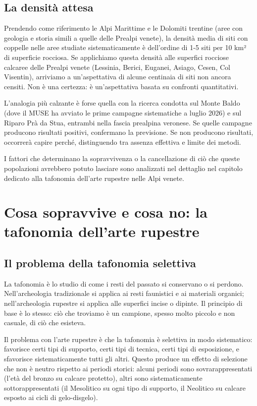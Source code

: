 \subsection{La densità attesa}

Prendendo come riferimento le Alpi Marittime e le Dolomiti trentine (aree con geologia e storia simili a quelle delle Prealpi venete), la densità media di siti con coppelle nelle aree studiate sistematicamente è dell'ordine di 1-5 siti per 10 km² di superficie rocciosa. Se applichiamo questa densità alle superfici rocciose calcaree delle Prealpi venete (Lessinia, Berici, Euganei, Asiago, Cesen, Col Visentin), arriviamo a un'aspettativa di alcune centinaia di siti non ancora censiti. Non è una certezza: è un'aspettativa basata su confronti quantitativi.

L'analogia più calzante è forse quella con la ricerca condotta sul Monte Baldo (dove il MUSE ha avviato le prime campagne sistematiche a luglio 2026) e sul Riparo Prà da Stua, entrambi nella fascia prealpina veronese. Se quelle campagne producono risultati positivi, confermano la previsione. Se non producono risultati, occorrerà capire perché, distinguendo tra assenza effettiva e limite dei metodi.

I fattori che determinano la sopravvivenza o la cancellazione di ciò che queste popolazioni avrebbero potuto lasciare sono analizzati nel dettaglio nel capitolo dedicato alla tafonomia dell'arte rupestre nelle Alpi venete.


\iffalse
\section{Cosa sopravvive e cosa no: la tafonomia dell'arte rupestre}

\subsection{Il problema della tafonomia selettiva}

La tafonomia è lo studio di come i resti del passato si conservano o si perdono. Nell'archeologia tradizionale si applica ai resti faunistici e ai materiali organici; nell'archeologia rupestre si applica alle superfici incise o dipinte. Il principio di base è lo stesso: ciò che troviamo è un campione, spesso molto piccolo e non casuale, di ciò che esisteva.

Il problema con l'arte rupestre è che la tafonomia è selettiva in modo sistematico: favorisce certi tipi di supporto, certi tipi di tecnica, certi tipi di esposizione, e sfavorisce sistematicamente tutti gli altri. Questo produce un effetto di selezione che non è neutro rispetto ai periodi storici: alcuni periodi sono sovrarappresentati (l'età del bronzo su calcare protetto), altri sono sistematicamente sottorappresentati (il Mesolitico su ogni tipo di supporto, il Neolitico su calcare esposto ai cicli di gelo-disgelo).

